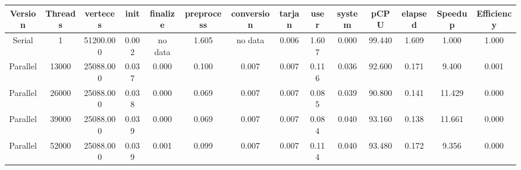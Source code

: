 \begin{tabular}{|c|c|c|c|c|c|c|c|c|c|c|c|c|c|}
\toprule
 Version &  Threads &  verteces &  init & finalize &  preprocess & conversion &  tarjan &  user &  system &   pCPU &  elapsed &  Speedup &  Efficiency \\
\midrule
  Serial &        1 & 51200.000 & 0.002 &  no data &       1.605 &    no data &   0.006 & 1.607 &   0.000 & 99.440 &    1.609 &    1.000 &       1.000 \\
Parallel &    13000 & 25088.000 & 0.037 &    0.000 &       0.100 &      0.007 &   0.007 & 0.116 &   0.036 & 92.600 &    0.171 &    9.400 &       0.001 \\
Parallel &    26000 & 25088.000 & 0.038 &    0.000 &       0.069 &      0.007 &   0.007 & 0.085 &   0.039 & 90.800 &    0.141 &   11.429 &       0.000 \\
Parallel &    39000 & 25088.000 & 0.039 &    0.000 &       0.069 &      0.007 &   0.007 & 0.084 &   0.040 & 93.160 &    0.138 &   11.661 &       0.000 \\
Parallel &    52000 & 25088.000 & 0.039 &    0.001 &       0.099 &      0.007 &   0.007 & 0.114 &   0.040 & 93.480 &    0.172 &    9.356 &       0.000 \\
\bottomrule
\end{tabular}
